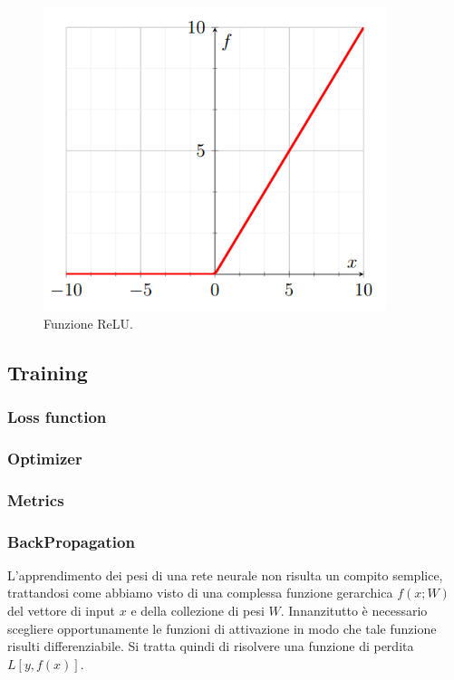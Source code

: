 \begin{figure}[htb]
	\centering
	\includegraphics[width = 100mm]{images/relu.png}
	\caption{Funzione ReLU.}
	\label{img:relu}
\end{figure}

\subsection{Training}

\subsubsection{Loss function}

\subsubsection{Optimizer}

\subsubsection{Metrics}



\subsubsection{BackPropagation}
\label{backprop}
L'apprendimento dei pesi di una rete neurale non risulta un compito semplice, trattandosi come abbiamo visto di una complessa funzione gerarchica $f(x;W)$ del vettore di input $x$ e della collezione di pesi $W$.  Innanzitutto è necessario scegliere opportunamente le funzioni di attivazione in modo che tale funzione risulti differenziabile. Si tratta quindi di risolvere una funzione di perdita $L[y, f(x)]$.

